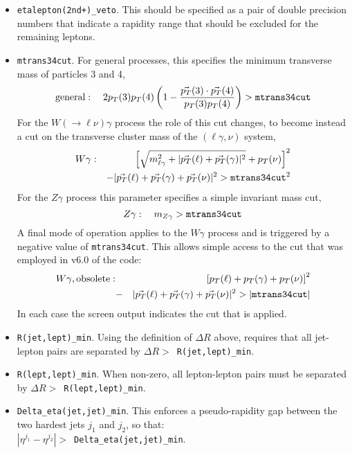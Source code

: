 \documentclass[12pt]{article}
\begin{document}
\begin{itemize}
\item {\tt etalepton(2nd+)\_veto}. This should be specified as a pair of double
precision numbers that indicate a rapidity range that should be excluded
for the remaining leptons.

\item {\tt mtrans34cut}. For general processes, this specifies the
minimum transverse mass of particles 3 and 4,
\begin{equation}
\mbox{general}: \quad 2 p_T(3) p_T(4) \left( 1 - \frac{\vec{p_T}(3) \cdot \vec{p_T}(4)}{p_T(3) p_T(4)} \right) 
> {\tt mtrans34cut} 
\end{equation}
For the $W(\to \ell \nu)\gamma$ process the role of this cut changes, to become
instead a cut on the transverse cluster mass of the $(\ell\gamma,\nu)$ system,
\begin{eqnarray}
 W\gamma: && \left[ \sqrt{m_{\ell\gamma}^2 + |\vec{p_T}(\ell)+\vec{p_T}(\gamma)|^2} + p_T(\nu) \right]^2
  \nonumber \\ &&
  -|\vec{p_T}(\ell)+\vec{p_T}(\gamma)+\vec{p_T}(\nu)|^2 > {\tt mtrans34cut}^2
\end{eqnarray}
For the $Z\gamma$ process this parameter specifies a simple invariant mass cut,
\begin{equation}
 Z\gamma: \quad m_{Z\gamma} > {\tt mtrans34cut}
\end{equation}
A final mode of operation applies to the $W\gamma$ process and is triggered by a negative value
of {\tt mtrans34cut}. This allows simple access to the cut that was employed in v6.0 of the code:
\begin{eqnarray}
 W\gamma, \mbox{obsolete}: &&
   \left[ p_T(\ell) +  p_T(\gamma) +  p_T(\nu) \right]^2 \nonumber \\ 
  &-&|\vec{p_T}(\ell)+\vec{p_T}(\gamma)+\vec{p_T}(\nu)|^2 > |{\tt mtrans34cut}|
\end{eqnarray}
In each case the screen output indicates the cut that is applied.

\item {\tt R(jet,lept)\_min}. Using the definition of $\Delta R$ above,
requires that all jet-lepton pairs are separated by
$\Delta R >$~{\tt R(jet,lept)\_min}.

\item {\tt R(lept,lept)\_min}. When non-zero, all lepton-lepton pairs
must be separated by $\Delta R >$~{\tt R(lept,lept)\_min}.

\item {\tt Delta\_eta(jet,jet)\_min}. This enforces a pseudo-rapidity
gap between the two hardest jets $j_1$ and $j_2$, so that: \\
$|\eta^{j_1} - \eta^{j_2}| >$~{\tt Delta\_eta(jet,jet)\_min}.


\end{itemize}
\end{document}
